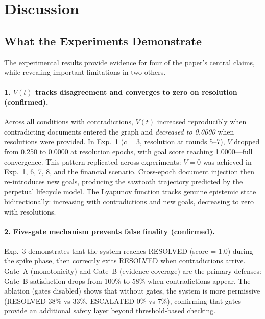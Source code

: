 \documentclass[11pt]{article}
\begin{document}
\section{Discussion}
\label{sec:discussion}

\subsection{What the Experiments Demonstrate}

The experimental results provide evidence for four of the paper's central claims, while revealing important limitations in two others.

\paragraph{1. $V(t)$ tracks disagreement and converges to zero on resolution (confirmed).} Across all conditions with contradictions, $V(t)$ increased reproducibly when contradicting documents entered the graph and \emph{decreased to 0.0000} when resolutions were provided. In Exp.~1 ($c = 3$, resolution at rounds 5--7), $V$ dropped from 0.250 to 0.0000 at resolution epochs, with goal score reaching 1.0000---full convergence. This pattern replicated across experiments: $V = 0$ was achieved in Exp.~1, 6, 7, 8, and the financial scenario. Cross-epoch document injection then re-introduces new goals, producing the sawtooth trajectory predicted by the perpetual lifecycle model. The Lyapunov function tracks genuine epistemic state bidirectionally: increasing with contradictions and new goals, decreasing to zero with resolutions.

\paragraph{2. Five-gate mechanism prevents false finality (confirmed).} Exp.~3 demonstrates that the system reaches RESOLVED (score = 1.0) during the spike phase, then correctly exits RESOLVED when contradictions arrive. Gate~A (monotonicity) and Gate~B (evidence coverage) are the primary defenses: Gate~B satisfaction drops from 100\% to 58\% when contradictions appear. The ablation (gates disabled) shows that without gates, the system is more permissive (RESOLVED 38\% vs 33\%, ESCALATED 0\% vs 7\%), confirming that gates provide an additional safety layer beyond threshold-based checking.
\end{document}

